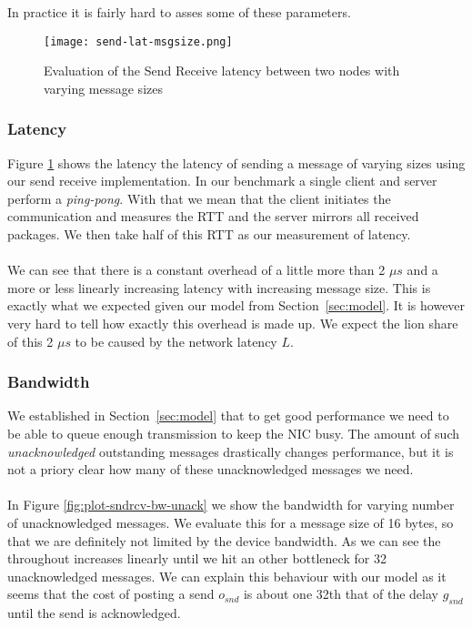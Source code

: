 In practice it is fairly hard to asses some of these parameters. 


\begin{figure}[h]
\texttt{[image: send-lat-msgsize.png]}
\caption{Evaluation of the Send Receive latency between two nodes with varying message sizes}
\label{fig:plot-sndrcv-lat}
\end{figure}

\subsubsection{Latency} 
Figure \ref{fig:plot-sndrcv-lat} shows the latency the latency of sending a message of varying sizes using
our send receive implementation. In our benchmark a single client and server perform a \emph{ping-pong}. With that 
we mean that the client initiates the communication and measures the RTT and the server mirrors all received packages. 
We then take half of this RTT as our measurement of latency.

\paragraph{} We can see that there is a constant overhead of a little more than 2 $\mu s$ and a more or less linearly 
increasing latency with increasing message size. This is exactly what we expected given our model from 
Section~\ref{sec:model}. It is however very hard to tell how exactly this overhead is made up. We expect the lion share
of this 2 $\mu s$ to be caused by the network latency $L$.



\subsubsection{Bandwidth}

We established in Section~\ref{sec:model} that to get good performance we need to be able to queue enough transmission
to keep the NIC busy. The amount of such \emph{unacknowledged} outstanding messages drastically changes performance, 
but it is not a priory clear how many of these unacknowledged messages we need. 

\paragraph{} In Figure \ref{fig:plot-sndrcv-bw-unack} we show the bandwidth for varying number of unacknowledged
messages. We evaluate this for a message size of 16 bytes, so that we are definitely not limited by the device bandwidth.
As we can see the throughout increases 
linearly until we hit an other bottleneck for 32 unacknowledged messages. We can explain this behaviour with our model
as it seems that the cost of posting a send $o_{snd}$ is about one 32th that of the delay $g_{snd}$ until the send is 
acknowledged.


